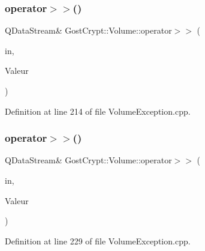 \subsubsection{\texorpdfstring{operator$>$$>$()}{operator>>()}\hspace{0.1cm}{\footnotesize\ttfamily [15/19]}}
{\footnotesize\ttfamily Q\+Data\+Stream\& Gost\+Crypt\+::\+Volume\+::operator$>$$>$ (\begin{DoxyParamCaption}\item[{Q\+Data\+Stream \&}]{in,  }\item[{\hyperlink{class_gost_crypt_1_1_volume_1_1_volume_version_not_compatible}{Gost\+Crypt\+::\+Volume\+::\+Volume\+Version\+Not\+Compatible} \&}]{Valeur }\end{DoxyParamCaption})}



Definition at line 214 of file Volume\+Exception.\+cpp.

\mbox{\label{namespace_gost_crypt_1_1_volume_af3d834104cdc24e0405b5576c19a7560}} 
\subsubsection{\texorpdfstring{operator$>$$>$()}{operator>>()}\hspace{0.1cm}{\footnotesize\ttfamily [16/19]}}
{\footnotesize\ttfamily Q\+Data\+Stream\& Gost\+Crypt\+::\+Volume\+::operator$>$$>$ (\begin{DoxyParamCaption}\item[{Q\+Data\+Stream \&}]{in,  }\item[{\hyperlink{class_gost_crypt_1_1_volume_1_1_protection_password_or_keyfiles_incorrect}{Gost\+Crypt\+::\+Volume\+::\+Protection\+Password\+Or\+Keyfiles\+Incorrect} \&}]{Valeur }\end{DoxyParamCaption})}



Definition at line 229 of file Volume\+Exception.\+cpp.

\mbox{\label{namespace_gost_crypt_1_1_volume_a2284a778eb34929de0d3ada5ac371c9d}} 
